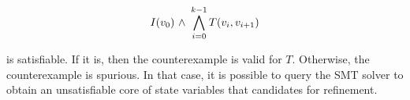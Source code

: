$$ I(v_0)
{\ \wedge \ } \bigwedge_{i=0}^{k-1} T(v_i,v_{i+1})$$ 


is satisfiable.  If it is, then the counterexample is valid for $T$.
Otherwise, the counterexample is spurious. In that case, it is possible to query
the SMT solver to obtain an unsatisfiable core of state variables that
candidates for refinement.













